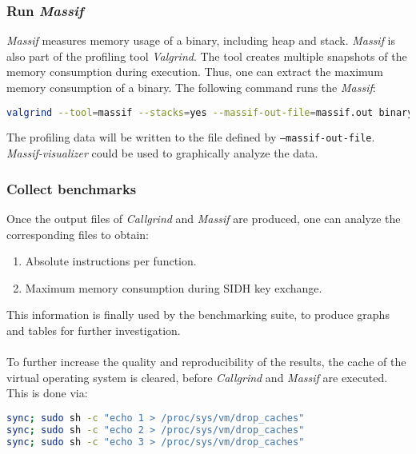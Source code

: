 \subsubsection{Run \textit{Massif}}
\textit{Massif} measures memory usage of a binary, including heap and stack. \textit{Massif} is also part of the profiling tool \textit{Valgrind}. The tool creates multiple snapshots of the memory consumption during execution. Thus, one can extract the maximum memory consumption of a binary. The following command runs the \textit{Massif}:
\begin{lstlisting}[language=Bash]
valgrind --tool=massif --stacks=yes --massif-out-file=massif.out binary
\end{lstlisting}
The profiling data will be written to the file defined by \texttt{--massif-out-file}. \textit{Massif-visualizer} could be used to graphically analyze the data.

\subsubsection{Collect benchmarks}
Once the output files of \textit{Callgrind} and \textit{Massif} are produced, one can analyze the corresponding files to obtain:
\begin{enumerate}
\item Absolute instructions per function.
\item Maximum memory consumption during SIDH key exchange.
\end{enumerate}
This information is finally used by the benchmarking suite, to produce graphs and tables for further investigation.\\\\
To further increase the quality and reproducibility of the results, the cache of the virtual operating system is cleared, before \textit{Callgrind} and \textit{Massif} are executed. This is done via:
\begin{lstlisting}[language=Bash]
sync; sudo sh -c "echo 1 > /proc/sys/vm/drop_caches"
sync; sudo sh -c "echo 2 > /proc/sys/vm/drop_caches"
sync; sudo sh -c "echo 3 > /proc/sys/vm/drop_caches"
\end{lstlisting}


